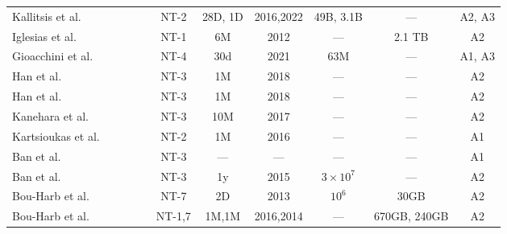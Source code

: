 \documentclass[manuscript,nonacm]{acmart}
\newcommand{\cmark}{\ding{51}}%
\begin{document}
\begin{table*}[h!]
\begin{tabular}{@{}lccccccccc@{}}
        Kallitsis et al.~\cite{2022kallitsis}
        & \cite{2021gioacchini}
        & \cmark & \cmark
        & NT-2
        & 28D, 1D & 2016,2022
        & 49B, 3.1B & ---
        & A2, A3 \\

        Iglesias et al.~\cite{2019iglesias}
        &  
        &  & \cmark
        & NT-1
        & 6M & 2012
        & --- & 2.1 TB
        & A2 \\

        Gioacchini et al.\textbf{~\cite{2021gioacchini}}~\cite{2023gioacchini}
        & \cite{2020cohen,2017ring}
        & \cmark & \cmark
        & NT-4
        & 30d & 2021
        & 63M & ---
        & A1, A3 \\

        Han et al.\textbf{~\cite{2020han}}~\cite{2022han}
        & \cite{2006takeuchi}
        & \cmark & \cmark
        & NT-3
        & 1M & 2018
        & --- & ---
        & A2 \\

        Han et al.\textbf{~\cite{2021han}}~\cite{2022han}
        & \cite{2020han,2006takeuchi,2019kanehara}
        & \cmark & 
        & NT-3
        & 1M & 2018
        & --- & ---
        & A2 \\

        Kanehara et al.\textbf{~\cite{2019kanehara}}~\cite{2022han}
        & \cite{2021han,2020han,2006takeuchi}
        & \cmark & \cmark
        & NT-3
        & 10M & 2017
        & --- & ---
        & A2 \\

        Kartsioukas et al.~\cite{2023kartsioukas}
        & \cite{2004lakhina}
        & \cmark & \cmark
        & NT-2
        & 1M & 2016
        & --- & ---
        & A1 \\

        Ban et al.~\cite{2017ban}
        & \cite{2012ban}
        &  & 
        & NT-3
        & --- & ---
        & --- & ---
        & A1 \\

        Ban et al.~\cite{2016ban}
        & 
        &  & 
        & NT-3
        & 1y & 2015
        & $3\times10^{7}$ & ---
        & A2 \\

        Bou-Harb et al.~\cite{2014bouharb}
        &  
        &  & 
        & NT-7
        & 2D & 2013
        & $10^6$ & 30GB
        & A2 \\

        Bou-Harb et al.\textbf{~\cite{2019bouharb}}~\cite{2015bouharb}
        & ~\cite{2018bouharb}
        &  & \cmark
        & NT-1,7
        & 1M,1M & 2016,2014
        & --- & 670GB, 240GB
        & A2 \\


\end{tabular}
\end{table*}
\end{document}
